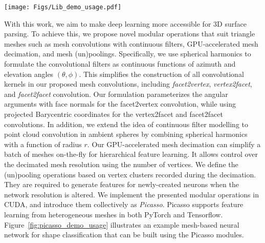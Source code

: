 \begin{figure*}[!t]
\centering
\texttt{[image: Figs/Lib\_demo\_usage.pdf]}
\vspace{-3mm}
\caption{(a) An example of building a simple hierarchical mesh network for shape classification using the mesh convolutions and poolings in Picasso. The network comprises  two hierarchical layers, and uses batch size 3 in this example. It accepts batch input as a tuple of $({\bf V}, {\bf F}, {\bf H}_G^0)$, where ${\bf V}$ denotes concatenated vertices, ${\bf F}$ are facets, and ${\bf H}_G^0$ denotes geometry features of the shapes. In this illustration, we decimate the input meshes by reducing their number of vertices by $N_r$. (b) Example configuration of the standard initial layer which considers the input features to comprise both geometry features, ${\bf H}_G^0$, and  texture features, ${\bf H}_C^0$. We discuss further details of this figure in the overview of Picasso in  \S~\ref{sec:overview}.}
\label{fig:picasso_demo_usage}
\vspace{-2mm}
\end{figure*}

{\color{black}
With this work, we aim to make deep learning more accessible for 3D surface parsing. To achieve this, we propose novel modular operations that suit triangle meshes such as mesh convolutions with continuous filters, GPU-accelerated mesh decimation, and mesh (un)poolings. 
Specifically, we use spherical harmonics to formulate the convolutional filters as continuous functions of azimuth and elevation angles $(\theta,\phi)$. This 
simplifies the construction of all convolutional kernels in our proposed mesh convolutions, including \textit{facet2vertex}, \textit{vertex2facet}, and \textit{facet2facet} convolution. 
Our formulation parameterizes the angular arguments with face normals for the facet2vertex convolution, while using projected Barycentric coordinates for the vertex2facet and facet2facet convolutions. In addition, we extend the idea of continuous filter modelling to point cloud convolution in ambient spheres by combining spherical harmonics with a function of radius $r$.} Our GPU-accelerated mesh decimation can simplify a batch of meshes on-the-fly for hierarchical feature learning.
It allows control over the decimated mesh resolution using the number of vertices. 
We define the (un)pooling operations based on vertex clusters recorded during the decimation. They are required to generate features for newly-created neurons when the network resolution is altered. 
We implement the presented modular operations in CUDA, and introduce them collectively as \textit{Picasso}. Picasso supports feature learning from heterogeneous
meshes in both PyTorch and Tensorflow.
Figure~\ref{fig:picasso_demo_usage} illustrates an example mesh-based neural network for shape classification
that can be built using the Picasso modules. 

